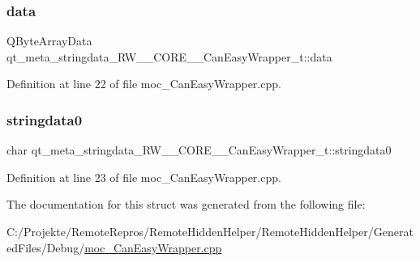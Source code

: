 \subsubsection{\texorpdfstring{data}{data}}
{\footnotesize\ttfamily Q\+Byte\+Array\+Data qt\+\_\+meta\+\_\+stringdata\+\_\+\+R\+W\+\_\+\+\_\+\+C\+O\+R\+E\+\_\+\+\_\+\+Can\+Easy\+Wrapper\+\_\+t\+::data}



Definition at line 22 of file moc\+\_\+\+Can\+Easy\+Wrapper.\+cpp.

\hypertarget{structqt__meta__stringdata___r_w_____c_o_r_e_____can_easy_wrapper__t_afb65167009a1a69e0769fcae6e2b53f7}{}\label{structqt__meta__stringdata___r_w_____c_o_r_e_____can_easy_wrapper__t_afb65167009a1a69e0769fcae6e2b53f7} 
\subsubsection{\texorpdfstring{stringdata0}{stringdata0}}
{\footnotesize\ttfamily char qt\+\_\+meta\+\_\+stringdata\+\_\+\+R\+W\+\_\+\+\_\+\+C\+O\+R\+E\+\_\+\+\_\+\+Can\+Easy\+Wrapper\+\_\+t\+::stringdata0}



Definition at line 23 of file moc\+\_\+\+Can\+Easy\+Wrapper.\+cpp.



The documentation for this struct was generated from the following file\+:\begin{DoxyCompactItemize}
\item 
C\+:/\+Projekte/\+Remote\+Repros/\+Remote\+Hidden\+Helper/\+Remote\+Hidden\+Helper/\+Generated\+Files/\+Debug/\hyperlink{_debug_2moc___can_easy_wrapper_8cpp}{moc\+\_\+\+Can\+Easy\+Wrapper.\+cpp}\end{DoxyCompactItemize}
